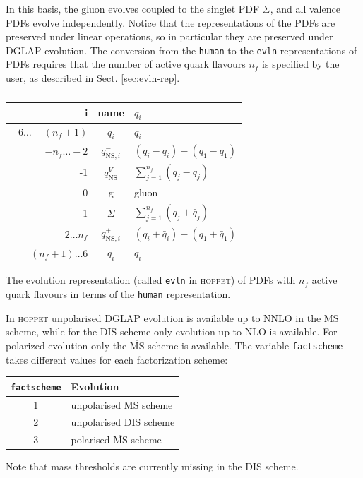 \documentclass[12pt]{article}
\newcommand{\MSbar}{\overline{\mathrm{MS}}}
\newcommand{\hoppet}{\textsc{hoppet}\xspace}
\newcommand{\ttt}[1]{\texttt{#1}}
\begin{document}
In this basis, the gluon evolves coupled to the singlet  PDF $\Sigma$,
and all valence PDFs evolve independently.
Notice that the representations of the PDFs
are preserved under linear operations, so in particular
they are preserved under DGLAP evolution.
The conversion from the \ttt{human} to the \ttt{evln}
representations of PDFs requires that the number of
active quark flavours $n_f$ is specified by the user, as described in
Sect. \ref{sec:evln-rep}.

\begin{table}
\begin{center}
\begin{tabular}{|r | c | l |}
\hline
     i & \mbox{name} & $q_i$ \\ \hline
     $ -6\ldots-(n_f+1)$ & $q_i$ & $q_i$\\
     $-n_f\ldots -2$ & $q_{\mathrm{NS},i}^{-}$ & 
$(q_i -  {\bar q}_i) - (q_1 - {\bar q}_1)$\\
      -1           & $q_{\mathrm{NS}}^{V}$ & 
$\sum_{j=1}^{n_f} (q_j -  {\bar q}_j)$\\
       0           & g & \textrm{gluon} \\
       1           & $\Sigma$ & $\sum_{j=1}^{n_f} (q_j +  {\bar q}_j)$\\
     $2\ldots n_f$ & $q_{\mathrm{NS},i}^{+}$ &
$ (q_i +  {\bar q}_i) - (q_1 + {\bar q}_1)$\\
      $(n_f+1)\ldots6$ & $q_i$ & $q_i$ \\
\hline
\end{tabular}
\caption{}{\label{eq:diag_split} The evolution representation 
(called \ttt{evln} in \hoppet)
of PDFs with $n_f$ active quark flavours
in terms of the \ttt{human} representation.}  
\end{center}
\end{table}

In \hoppet unpolarised DGLAP evolution is available up to NNLO
in the $\MSbar$ scheme, while for the DIS scheme
only evolution up to NLO is available. For polarized evolution only
the $\MSbar$ scheme is available. The variable \ttt{factscheme}
takes different values for each factorization scheme:
\begin{center}
  \begin{tabular}{|c|l|}\hline
    \ttt{factscheme} & Evolution\\[2pt]\hline
    1 & unpolarised $\MSbar$ scheme\\[2pt]\hline
    2 & unpolarised DIS scheme\\[2pt]\hline
    3 & polarised $\MSbar$ scheme\\\hline
  \end{tabular}
\end{center}
Note that mass thresholds are currently
missing in the DIS scheme.
\end{document}
